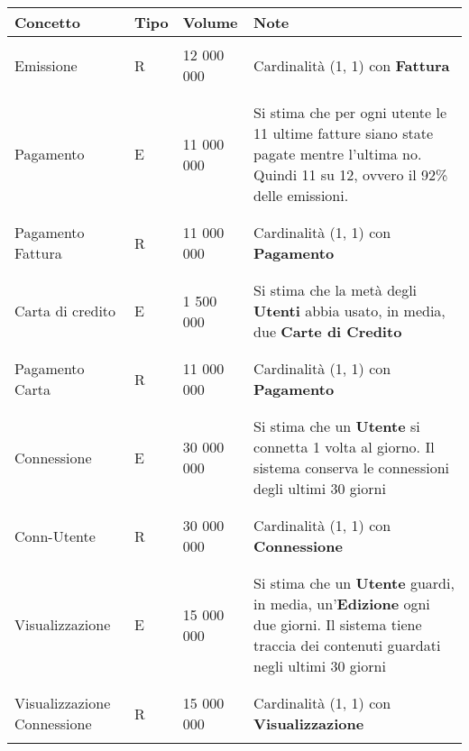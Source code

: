 \documentclass{article}
\begin{document}
\begin{tabular}{|C{2.3cm}|C{0.7cm}|C{1.7cm}|C{6.2cm}|}
\hline
    \textbf{Concetto} & \textbf{Tipo} & \textbf{Volume} & \textbf{Note} \\
\hline
\hline
& & & \\    
    Emissione & R & 12 000 000 & Cardinalità (1, 1) con \textbf{Fattura} \\
& & & \\
\hline
& & & \\    
    Pagamento & E & 11 000 000 & Si stima che per ogni utente le 11 ultime fatture siano state pagate mentre l'ultima no. Quindi 11 su 12, ovvero il 92\% delle emissioni.  \\
& & & \\
\hline
& & & \\    
    Pagamento Fattura & R & 11 000 000 & Cardinalità (1, 1) con \textbf{Pagamento} \\
& & & \\
\hline
& & & \\    
    Carta di credito & E & 1 500 000 & Si stima che la metà degli \textbf{Utenti} abbia usato, in media,  due \textbf{Carte di Credito} \\
& & & \\
\hline
& & & \\    
    Pagamento Carta & R & 11 000 000 & Cardinalità (1, 1) con \textbf{Pagamento} \\
& & & \\
\hline
& & & \\    
    Connessione & E & 30 000 000 & Si stima che un \textbf{Utente} si connetta 1 volta al giorno. Il sistema conserva le connessioni degli ultimi 30 giorni \\
& & & \\
\hline
& & & \\    
    Conn-Utente & R & 30 000 000 & Cardinalità (1, 1) con \textbf{Connessione} \\
& & & \\
\hline
& & & \\    
    Visualizzazione & E & 15 000 000 & Si stima che un \textbf{Utente} guardi, in media, un'\textbf{Edizione} ogni due giorni. Il sistema tiene traccia dei contenuti guardati negli ultimi 30 giorni \\
& & & \\
\hline
& & & \\    
    Visualizzazione Connessione & R & 15 000 000  & Cardinalità (1, 1) con \textbf{Visualizzazione} \\
& & & \\
\hline
\end{tabular}
\end{document}
